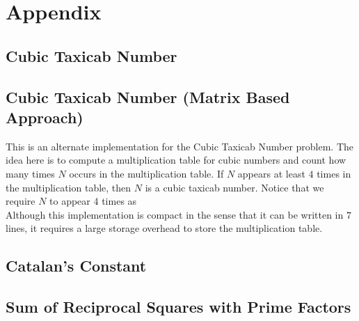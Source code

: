 \section{Appendix}

\subsection{Cubic Taxicab Number}




\newpage
\subsection{Cubic Taxicab Number (Matrix Based Approach)}
This is an alternate implementation for the Cubic Taxicab Number problem. The idea here is to compute a multiplication table for cubic numbers and count how many times $N$ occurs in the multiplication table. If $N$ appears at least $4$ times in the multiplication table, then $N$ is a cubic taxicab number. Notice that we require $N$ to appear $4$ times as \\

\noindent
Although this implementation is compact in the sense that it can be written in $7$ lines, it requires a large storage overhead to store the multiplication table.



\subsection{Catalan's Constant}


\newpage
\subsection{Sum of Reciprocal Squares with Prime Factors}

